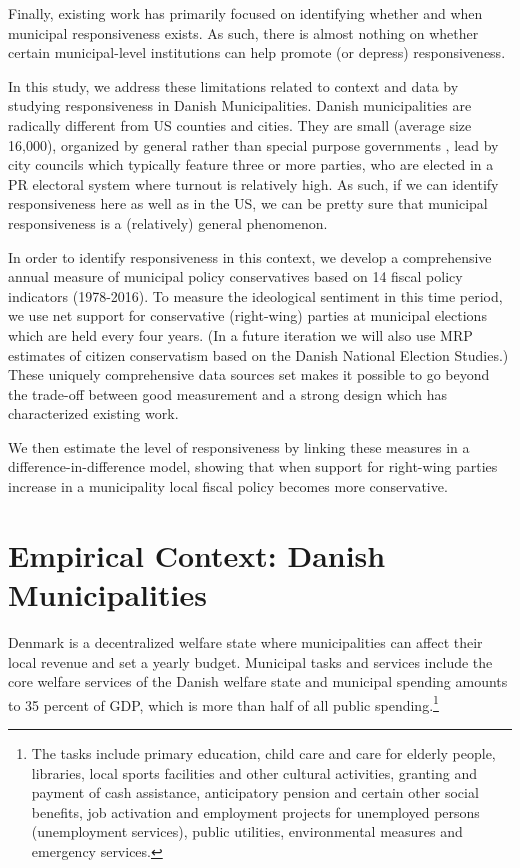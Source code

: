 \documentclass[a4paper,12pt]{article}
\begin{document}
Finally, existing work has primarily focused on identifying whether and when municipal responsiveness exists. As such, there is almost nothing on whether certain municipal-level institutions can help promote (or depress) responsiveness. 

In this study, we address these limitations related to context and data by studying responsiveness in Danish Municipalities. Danish municipalities are radically different from US counties and cities. They are small (average size 16,000), organized by general rather than special purpose governments \cite{berry2009imperfect}, lead by city councils which typically feature three or more parties, who are elected in a PR electoral system where turnout is relatively high. As such, if we can identify responsiveness here as well as in the US, we can be pretty sure that municipal responsiveness is a (relatively) general phenomenon.

In order to identify responsiveness in this context, we develop a comprehensive annual measure of municipal policy conservatives based on 14 fiscal policy indicators (1978-2016). To measure the ideological sentiment in this time period, we use net support for conservative (right-wing) parties at municipal elections which are held every four years. (In a future iteration we will also use MRP estimates of citizen conservatism based on the Danish National Election Studies.) These uniquely comprehensive data sources set makes it possible to  go beyond the trade-off between good measurement and a strong design which has characterized existing work. 

We then estimate the level of responsiveness by linking these measures in a difference-in-difference model, showing that when support for right-wing parties increase in a municipality local fiscal policy becomes more conservative.  

\section{Empirical Context: Danish Municipalities}	

Denmark is a decentralized welfare state where municipalities can affect their local revenue and set a yearly budget.  Municipal tasks and services include the core welfare services of the Danish welfare state and municipal spending amounts to 35 percent of GDP, which is more than half of all public spending.\footnote{The tasks include primary education, child care and care for elderly people, libraries, local sports facilities and other cultural activities, granting and payment of cash assistance, anticipatory pension and certain other social benefits, job activation and employment projects for unemployed persons (unemployment services), public utilities, environmental measures and emergency services.}
\end{document}
